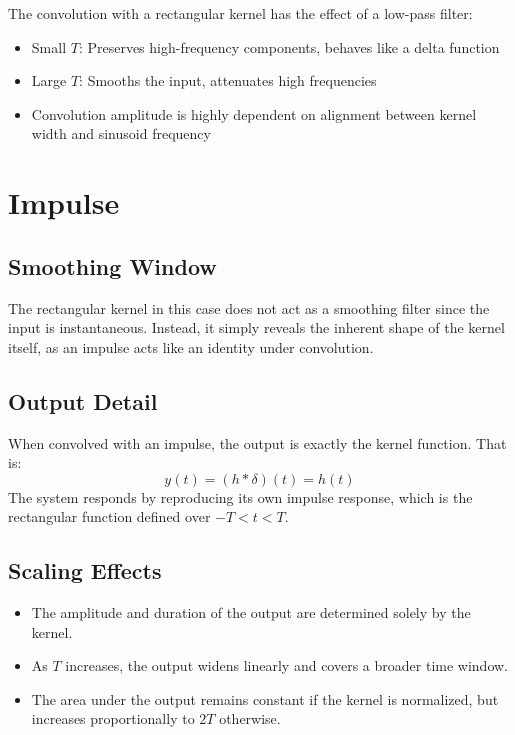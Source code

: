 \documentclass[12pt,a4paper]{report}
\begin{document}
The convolution with a rectangular kernel has the effect of a low-pass filter:

\begin{itemize}
    \item Small \( T \): Preserves high-frequency components, behaves like a delta function
    \item Large \( T \): Smooths the input, attenuates high frequencies
    \item Convolution amplitude is highly dependent on alignment between kernel width and sinusoid frequency
\end{itemize}
\section{Impulse}

\subsection{Smoothing Window}

The rectangular kernel in this case does not act as a smoothing filter since the input is instantaneous. Instead, it simply reveals the inherent shape of the kernel itself, as an impulse acts like an identity under convolution.

\subsection{Output Detail}

When convolved with an impulse, the output is exactly the kernel function. That is:
\[
y(t) = (h * \delta)(t) = h(t)
\]
The system responds by reproducing its own impulse response, which is the rectangular function defined over \( -T < t < T \).

\subsection{Scaling Effects}

\begin{itemize}
    \item The amplitude and duration of the output are determined solely by the kernel.
    \item As \( T \) increases, the output widens linearly and covers a broader time window.
    \item The area under the output remains constant if the kernel is normalized, but increases proportionally to \( 2T \) otherwise.
\end{itemize}
\end{document}
